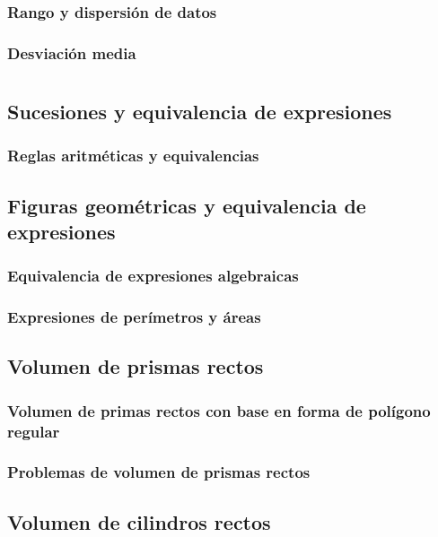 \documentclass[11pt]{book}
\begin{document}
\subsection{Rango y dispersi\'on de datos}
\subsection{Desviaci\'on media}


\chapter{}

\section{Sucesiones y equivalencia de expresiones}
\subsection{Reglas aritméticas y equivalencias}

\section{Figuras geométricas y equivalencia de expresiones}
\subsection{Equivalencia de expresiones algebraicas}
\subsection{Expresiones de perímetros y áreas}

\section{Volumen de prismas rectos}
\subsection{Volumen de primas rectos con base en forma de polígono regular}
\subsection{Problemas de volumen de prismas rectos}

\section{Volumen de cilindros rectos}
\end{document}
